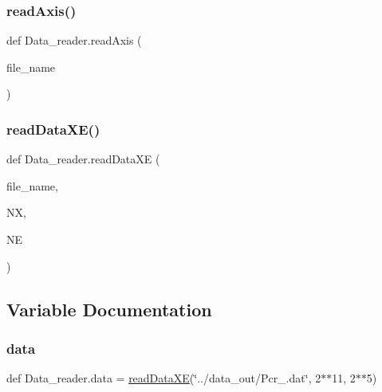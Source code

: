 \subsubsection{\texorpdfstring{read\+Axis()}{readAxis()}}
{\footnotesize\ttfamily def Data\+\_\+reader.\+read\+Axis (\begin{DoxyParamCaption}\item[{}]{file\+\_\+name }\end{DoxyParamCaption})}

\mbox{\label{namespaceData__reader_a868131ea6f864c92c46f238396b1299b}} 
\subsubsection{\texorpdfstring{read\+Data\+X\+E()}{readDataXE()}}
{\footnotesize\ttfamily def Data\+\_\+reader.\+read\+Data\+XE (\begin{DoxyParamCaption}\item[{}]{file\+\_\+name,  }\item[{}]{NX,  }\item[{}]{NE }\end{DoxyParamCaption})}



\subsection{Variable Documentation}
\mbox{\label{namespaceData__reader_a6deb6bef39c1b18de8cd2a0641051e59}} 
\subsubsection{\texorpdfstring{data}{data}}
{\footnotesize\ttfamily def Data\+\_\+reader.\+data = \hyperlink{namespaceData__reader_a868131ea6f864c92c46f238396b1299b}{read\+Data\+XE}(\char`\"{}../data\+\_\+out/Pcr\+\_.\+dat\char`\"{}, 2$\ast$$\ast$11, 2$\ast$$\ast$5)}

\mbox{\label{namespaceData__reader_a701bfdb99cb202b34e585ac904282a44}} 

